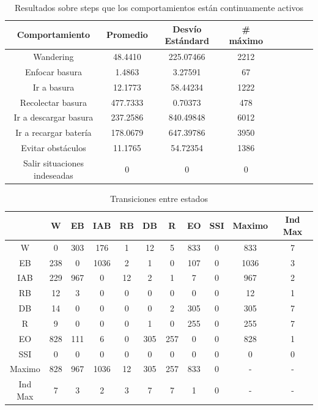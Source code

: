 \begin{table}[ht]
	\begin{center}
		\begin{tabular}{|c|c|c|c|c|c|c|c|c|}
			\hline
			Comportamiento & Promedio & Desv\'io Est\'andard & \# m\'aximo \\
			\hline
			Wandering & 48.4410 & 225.07466 & 2212 \\
			Enfocar basura & 1.4863 & 3.27591 & 67 \\
			Ir a basura & 12.1773 & 58.44234 & 1222 \\
			Recolectar basura & 477.7333 & 0.70373 & 478 \\
			Ir a descargar basura & 237.2586 & 840.49848 & 6012 \\
			Ir a recargar bater\'ia & 178.0679 & 647.39786 & 3950 \\
			Evitar obst\'aculos & 11.1765 & 54.72354 & 1386 \\
			Salir situaciones indeseadas & 0 & 0 & 0 \\
			\hline
		\end{tabular}
	\end{center}
	\caption{Resultados sobre steps que los comportamientos est\'an continuamente activos}
	\label{behaviours_stats1}
\end{table}

\begin{table}
	\begin{center}
		\begin{tabular}{|c||c|c|c|c|c|c|c|c||c|c|}
		\hline
    	 & W & EB & IAB & RB & DB & R & EO & SSI & Maximo & Ind Max \\
		\hline
		\hline
			W &     0&    303&    176&      1&     12&      5&    833&      0&    833&      7\\
		\hline
			EB &   238&      0&   1036&      2&      1&      0&    107&      0&   1036&      3\\
		\hline
			IAB &    229&    967&      0&     12&      2&      1&      7&      0&    967&      2\\
		\hline
			RB &     12&      3&      0&      0&      0&      0&      0&      0&     12&      1\\
		\hline
			DB &     14&      0&      0&      0&      0&      2&    305&      0&    305&      7\\
		\hline
			R &      9&      0&      0&      0&      1&      0&    255&      0&    255&      7\\
		\hline
			EO &    828&    111&      6&      0&    305&    257&      0&      0&    828&      1\\
		\hline
			SSI &      0&      0&      0&      0&      0&      0&      0&      0&      0&      0\\
		\hline
		\noalign{\smallskip}
		\hline
			Maximo &    828&    967&   1036&     12&    305&    257&    833&      0&      -&      -\\
		\hline
			Ind Max &      7&      3&      2&      3&      7&      7&      1&      0&      -&      -\\
		\hline
		\end{tabular}
	\end{center}
	\caption{Transiciones entre estados}
	\label{transitions}
\end{table}

